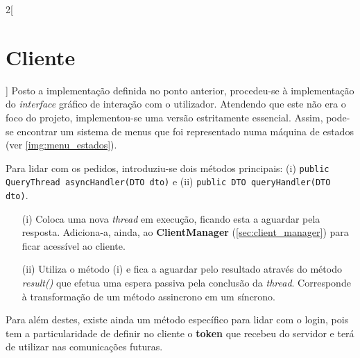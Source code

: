 \documentclass[a4paper,11pt]{article}
\begin{document}
\begin{multicols}{2}[\section{Cliente}] \label{sec:cliente}
    Posto a implementação definida no ponto anterior, procedeu-se à implementação
    do \textit{interface} gráfico de interação com o utilizador.
    Atendendo que este não era o foco do projeto, implementou-se uma versão estritamente
    essencial.
    Assim, pode-se encontrar um sistema de menus que foi representado numa máquina
    de estados (ver \ref{img:menu_estados}).
    
    Para lidar com os pedidos, introduziu-se dois métodos principais: (i) \texttt{public QueryThread asyncHandler(DTO dto)}
    e (ii) \texttt{public DTO queryHandler(DTO dto)}.
    \begin{itemize}
        \item[(i)]{
              Coloca uma nova \textit{thread} em execução, ficando esta a aguardar pela resposta.
              Adiciona-a, ainda, ao \textbf{ClientManager} (\ref{sec:client_manager}) para ficar acessível
              ao cliente.
              }
        \item[(ii)]{
              Utiliza o método (i) e fica a aguardar pelo resultado através do método
              \textit{result()} que efetua uma espera passiva pela conclusão da \textit{thread}.
              Corresponde à transformação de um método assincrono em um síncrono.
              }
    \end{itemize}
    Para além destes, existe ainda um método específico para lidar com o login,
    pois tem a particularidade de definir no cliente o \textbf{token} que recebeu
    do servidor e terá de utilizar nas comunicações futuras.
    

\end{multicols}
\end{document}

